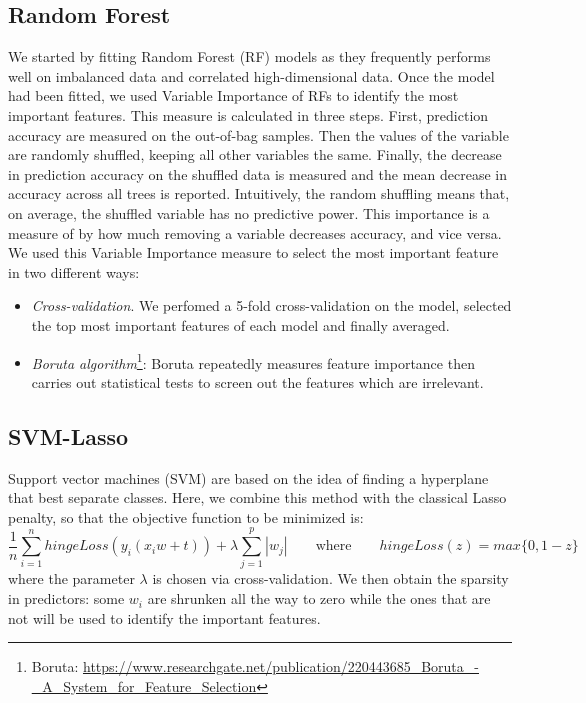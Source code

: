\documentclass[a4paper,11pt, oneside]{article}  %
\begin{document}
\subsection{Random Forest}
We started by fitting Random Forest (RF) models as they frequently performs well on imbalanced data and correlated high-dimensional data.  Once the model had been fitted,  we used Variable Importance of RFs to identify the most important features. This measure is calculated in three steps.  First, prediction accuracy are measured on the out-of-bag samples. Then the values of the variable are randomly shuffled, keeping all other variables the same. Finally, the decrease in prediction accuracy on the shuffled data is measured and the mean decrease in accuracy across all trees is reported. Intuitively, the random shuffling means that, on average, the shuffled variable has no predictive power. This importance is a measure of by how much removing a variable decreases accuracy, and vice versa. \\
We used this Variable Importance measure to select the most important feature in two different ways:

\begin{itemize}
	\item \textit{Cross-validation}. We perfomed a 5-fold cross-validation on the model, selected the top most important features of each model and finally averaged.
	\item \textit{Boruta algorithm}\footnote{Boruta: \url{https://www.researchgate.net/publication/220443685_Boruta_-_A_System_for_Feature_Selection}}: Boruta repeatedly measures feature importance then carries out statistical tests to screen out the features which are irrelevant. 
\end{itemize} 


\subsection{SVM-Lasso}
Support vector machines (SVM) are based on the idea of finding a hyperplane that best separate classes. Here, we combine this method with the classical Lasso penalty,  so that the objective function to be minimized is:
\begin{equation*}
	\dfrac{1}{n} \sum_{i=1}^n hingeLoss(y_i(x_i w + t)) + \lambda \sum_{j=1}^p |w_j|  \qquad	\text{where} \qquad  hingeLoss(z) = max\{0, 1-z\}
\end{equation*}
where the parameter $\lambda$ is chosen via cross-validation.  We then obtain the sparsity in predictors: some $w_i$ are shrunken all the way to zero while the ones that are not will be used to identify the important features. 
\end{document}
